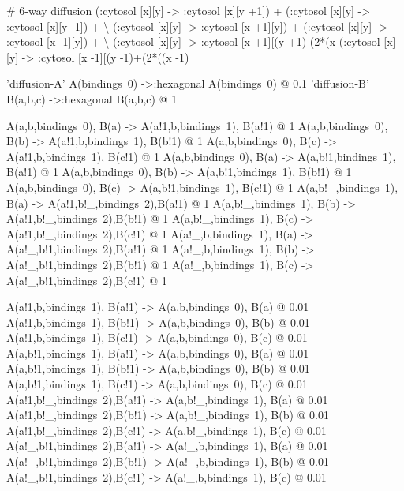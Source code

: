 \documentclass[english]{report}
\begin{document}
\begin{kappasource}


# 6-way diffusion
    (:cytosol [x][y] -> :cytosol [x][y +1]) + (:cytosol [x][y] -> :cytosol [x][y -1]) + {\textbackslash}
    (:cytosol [x][y] -> :cytosol [x +1][y]) + (:cytosol [x][y] -> :cytosol [x -1][y]) + {\textbackslash}
    (:cytosol [x][y] -> :cytosol [x +1][(y +1)-(2*(x%
    (:cytosol [x][y] -> :cytosol [x -1][(y -1)+(2*((x -1)%

'diffusion-A' A(bindings~0) ->:hexagonal A(bindings~0) @ 0.1
'diffusion-B' B(a,b,c) ->:hexagonal B(a,b,c) @ 1

A(a,b,bindings~0),   B(a) -> A(a!1,b,bindings~1),  B(a!1) @ 1
A(a,b,bindings~0),   B(b) -> A(a!1,b,bindings~1),  B(b!1) @ 1
A(a,b,bindings~0),   B(c) -> A(a!1,b,bindings~1),  B(c!1) @ 1
A(a,b,bindings~0),   B(a) -> A(a,b!1,bindings~1),  B(a!1) @ 1
A(a,b,bindings~0),   B(b) -> A(a,b!1,bindings~1),  B(b!1) @ 1
A(a,b,bindings~0),   B(c) -> A(a,b!1,bindings~1),  B(c!1) @ 1
A(a,b!_,bindings~1), B(a) -> A(a!1,b!_,bindings~2),B(a!1) @ 1
A(a,b!_,bindings~1), B(b) -> A(a!1,b!_,bindings~2),B(b!1) @ 1
A(a,b!_,bindings~1), B(c) -> A(a!1,b!_,bindings~2),B(c!1) @ 1
A(a!_,b,bindings~1), B(a) -> A(a!_,b!1,bindings~2),B(a!1) @ 1
A(a!_,b,bindings~1), B(b) -> A(a!_,b!1,bindings~2),B(b!1) @ 1
A(a!_,b,bindings~1), B(c) -> A(a!_,b!1,bindings~2),B(c!1) @ 1

A(a!1,b,bindings~1),  B(a!1) -> A(a,b,bindings~0),   B(a) @ 0.01
A(a!1,b,bindings~1),  B(b!1) -> A(a,b,bindings~0),   B(b) @ 0.01
A(a!1,b,bindings~1),  B(c!1) -> A(a,b,bindings~0),   B(c) @ 0.01
A(a,b!1,bindings~1),  B(a!1) -> A(a,b,bindings~0),   B(a) @ 0.01
A(a,b!1,bindings~1),  B(b!1) -> A(a,b,bindings~0),   B(b) @ 0.01
A(a,b!1,bindings~1),  B(c!1) -> A(a,b,bindings~0),   B(c) @ 0.01
A(a!1,b!_,bindings~2),B(a!1) -> A(a,b!_,bindings~1), B(a) @ 0.01
A(a!1,b!_,bindings~2),B(b!1) -> A(a,b!_,bindings~1), B(b) @ 0.01
A(a!1,b!_,bindings~2),B(c!1) -> A(a,b!_,bindings~1), B(c) @ 0.01
A(a!_,b!1,bindings~2),B(a!1) -> A(a!_,b,bindings~1), B(a) @ 0.01
A(a!_,b!1,bindings~2),B(b!1) -> A(a!_,b,bindings~1), B(b) @ 0.01
A(a!_,b!1,bindings~2),B(c!1) -> A(a!_,b,bindings~1), B(c) @ 0.01


\end{kappasource}




\end{document}
